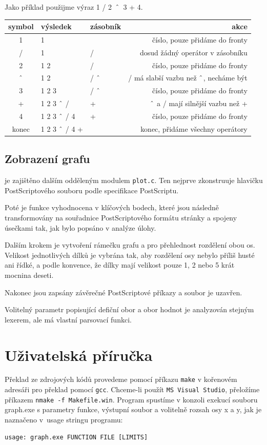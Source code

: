 \documentclass[11pt]{article}
\newcommand\CARET{\mathbin{\char`\^}}
\begin{document}
\clearpage
Jako příklad použijme výraz 1 / 2~$\CARET$~3 + 4.
\begin{center}
\begin{tabular}{|c|l|l|r|}
\hline
symbol & výsledek & zásobník & akce \\
\hline
1 & 1 & & číslo, pouze přidáme do fronty \\
/ & 1 & / & dosud žádný operátor v zásobníku\\
2 & 1 2 & / & číslo, pouze přidáme do fronty \\
$\CARET$ & 1 2 & / $\CARET$ & / má slabší vazbu než $\CARET$, necháme být \\
3 & 1 2 3 & / $\CARET$ & číslo, pouze přidáme do fronty \\
+ & 1 2 3 $\CARET$ / & + & $\CARET$ a / mají silnější vazbu než + \\
4 & 1 2 3 $\CARET$ / 4 & + & číslo, pouze přidáme do fronty \\
konec  & 1 2 3 $\CARET$ / 4 + & & konec, přidáme všechny operátory \\

\hline
\end{tabular}
\end{center}

\subsection{Zobrazení grafu}
je zajištěno dalším odděleným modulem \texttt{plot.c}. Ten nejprve zkonstruuje
hlavičku PostScriptového souboru podle specifikace PostScriptu. 

Poté je funkce vyhodnocena v klíčových bodech, které jsou následně
transformovány na souřadnice PostScriptového formátu stránky a spojeny úsečkami
tak, jak bylo popsáno v analýze úlohy. 

Dalším krokem je vytvoření rámečku grafu a pro přehlednost rozdělení obou os.
Velikost jednotlivých dílků je vybrána tak, aby rozdělení osy nebylo příliš
husté ani řídké, a podle konvence, že dílky mají velikost pouze 1, 2 nebo 5
krát mocnina deseti.

Nakonec jsou zapsány závěrečné PostScriptové příkazy a soubor je uzavřen.

Volitelný parametr popisující defiční obor a obor hodnot je analyzován stejným
lexerem, ale má vlastní parsovací funkci.

\section{Uživatelská příručka}
Překlad ze zdrojových kódů provedeme pomocí příkazu \texttt{make} v kořenovém
adresáři pro překlad pomocí \texttt{gcc}. Chceme-li použít \texttt{MS Visual
Studio}, přeložíme příkazem \texttt{nmake -f Makefile.win}.  Program spustíme v
konzoli exekucí souboru graph.exe s parametry funkce, výstupní soubor a
volitelně rozsah osy x a y, jak je naznačeno v~usage stringu programu:
\begin{verbatim}
usage: graph.exe FUNCTION FILE [LIMITS]
\end{verbatim}
\end{document}
